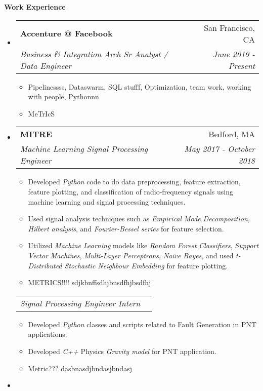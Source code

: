 \documentclass[letterpaper, 8pt]{extarticle}
\makeatletter
\newcommand{\resitem}[1]{\item #1 \vspace{-2pt}}
\newcommand{\resheading}[1]{{\large \colorbox{mygrey}{\begin{minipage}{0.99\textwidth}{\textbf{#1 \vphantom{p\^{E}}}}\end{minipage}}}}
\newcommand{\ressubheading}[4]{
\begin{tabular*}{7.40in}{l@{\extracolsep{\fill}}r}
		\textbf{#1} & #2 \\
		\textit{#3} & \textit{#4} \\
\end{tabular*}\vspace{-6pt}}
\newcommand{\rehead}[2]{
\begin{tabular*}{7.40in}{l@{\extracolsep{\fill}}r}
        \textit{#1} & \textit{#2} \\
\end{tabular*}\vspace{-6pt}}
\makeatother
\begin{document}
\resheading{Work Experience}
\begin{itemize}
\setlength{\leftmargini}{0.5em}

\item
    \ressubheading{Accenture @ Facebook}{San Francisco, CA}{Business \& Integration Arch Sr Analyst / Data Engineer}{June 2019 - Present}
    \begin{itemize}
        \resitem{Pipelinessss, Dataswarm, SQL stufff, Optimization, team work, working with people, Pythonnn } 
        \resitem{MeTrIcS} 
    \end{itemize}



\item
	\ressubheading{MITRE}{Bedford, MA}{Machine Learning Signal Processing Engineer}{May 2017 - October 2018}
	\begin{itemize}
		\resitem{Developed \emph{Python} code to do data preprocessing, feature extraction, feature plotting, and classification of radio-frequency signals using machine learning and signal processing techniques.}
        \resitem{Used signal analysis techniques such as \emph{Empirical Mode Decomposition}, \emph{Hilbert analysis}, and \emph{Fourier-Bessel series} for feature selection.}
        \resitem{Utilized \emph{Machine Learning} models like \emph{Random Forest Classifiers}, \emph{Support Vector Machines}, \emph{Multi-Layer Perceptrons}, \emph{Naive Bayes}, and used \emph{t-Distributed Stochastic Neighbour Embedding} for feature plotting.}
        \resitem{METRICS!!!!   sdjkbnffsdhjbnsdfhjbsdfhj}
	\end{itemize}
	\vspace{-3pt}
	\rehead{Signal Processing Engineer Intern}{}
	\begin{itemize}
		\resitem{Developed \emph{Python} classes and scripts related to Fault Generation in PNT applications.}
		\resitem{Developed \emph{C++} Physics \emph{Gravity model} for PNT application.}
		\resitem{Metric??? dasbnasdjbndasjbndasj}
	\end{itemize}
\item

\end{itemize}
\end{document}
